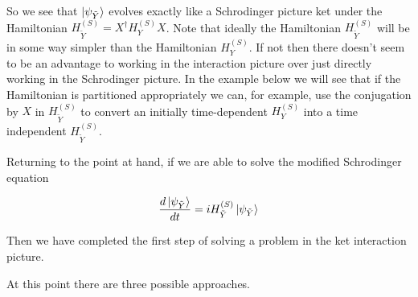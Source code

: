 \documentclass[12pt]{article}
\begin{document}
So we see that $\ket{\psi_{\tilde{Y}}}$ evolves exactly like a Schrodinger picture ket under the Hamiltonian $H_{\tilde{Y}}^{(S)} = X^{\dag}H_Y^{(S)}X$.
Note that ideally the Hamiltonian $H_{\tilde{Y}}^{(S)}$ will be in some way simpler than the Hamiltonian $H_Y^{(S)}$.
If not then there doesn't seem to be an advantage to working in the interaction picture over just directly working in the Schrodinger picture.
In the example below we will see that if the Hamiltonian is partitioned appropriately we can, for example, use the conjugation by $X$ in $H_{\tilde{Y}}^{(S)}$ to convert an initially time-dependent $H_Y^{(S)}$ into a time independent $H_{\tilde{Y}}^{(S)}$.


Returning to the point at hand, if we are able to solve the modified Schrodinger equation

\begin{align}
\frac{d\ket{\psi_{\tilde{Y}}}}{dt} = iH_{\tilde{Y}}^{(S)} \ket{\psi_{\tilde{Y}}}
\end{align}

Then we have completed the first step of solving a problem in the ket interaction picture.

At this point there are three possible approaches.
\end{document}
